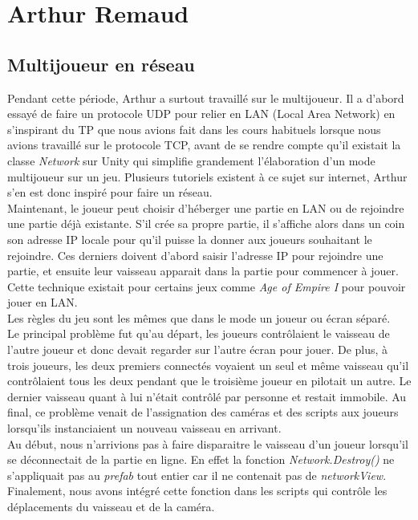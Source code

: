 \documentclass[10pt, titlepage]{report}
\begin{document}
\section{Arthur Remaud}

\subsection{Multijoueur en réseau}
Pendant cette période, Arthur a surtout travaillé sur le multijoueur. Il a d'abord essayé de faire un protocole UDP pour relier en LAN (Local Area Network) en s'inspirant du TP que nous avions fait dans les cours habituels lorsque nous avions travaillé sur le protocole TCP, avant de se rendre compte qu'il existait la classe \textit{Network} sur Unity qui simplifie grandement l'élaboration d'un mode multijoueur sur un jeu. Plusieurs tutoriels existent à ce sujet sur internet, Arthur s'en est donc inspiré pour faire un réseau.\\

Maintenant, le joueur peut choisir d'héberger une partie en LAN ou de rejoindre une partie déjà existante. S'il crée sa propre partie, il s'affiche alors dans un coin son adresse IP locale pour qu'il puisse la donner aux joueurs souhaitant le rejoindre. Ces derniers doivent d'abord saisir l'adresse IP pour rejoindre une partie, et ensuite leur vaisseau apparait dans la partie pour commencer à jouer. Cette technique existait pour certains jeux comme \textit{Age of Empire I} pour pouvoir jouer en LAN.\\

Les règles du jeu sont les mêmes que dans le mode un joueur ou écran séparé.\\

Le principal problème fut qu'au départ, les joueurs contrôlaient le vaisseau de l'autre joueur et donc devait regarder sur l'autre écran pour jouer. De plus, à trois joueurs, les deux premiers connectés voyaient un seul et même vaisseau qu'il contrôlaient tous les deux pendant que le troisième joueur en pilotait un autre. Le dernier vaisseau quant à lui n'était contrôlé par personne et restait immobile. Au final, ce problème venait de l'assignation des caméras et des scripts aux joueurs lorsqu'ils instanciaient un nouveau vaisseau en arrivant.\\

Au début, nous n'arrivions pas à faire disparaitre le vaisseau d'un joueur lorsqu'il se déconnectait de la partie en ligne. En effet la fonction \textit{Network.Destroy()} ne s'appliquait pas au \textit{prefab} tout entier car il ne contenait pas de \textit{networkView}. Finalement, nous avons intégré cette fonction dans les scripts qui contrôle les déplacements du vaisseau et de la caméra.\\
\end{document}
